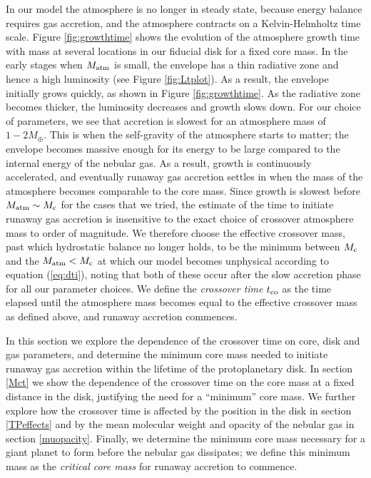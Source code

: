 \documentclass[apj]{emulateapj}
\begin{document}
In our model the atmosphere is no longer in steady state, because energy balance requires gas accretion, and the atmosphere contracts on a Kelvin-Helmholtz time scale. Figure \ref{fig:growthtime} shows the evolution of the atmosphere growth time with mass at several locations in our fiducial disk for a fixed core mass. In the early stages when $M_{\rm{atm}}$ is small, the envelope has a thin radiative zone and hence a high luminosity (see Figure \ref{fig:Ltplot}). As a result, the envelope initially grows quickly, as shown in Figure \ref{fig:growthtime}. As the radiative zone becomes thicker, the luminosity decreases and growth slows down. For our choice of parameters, we see that accretion is slowest for an atmosphere mass of $1-2 M_{\oplus}$. This is when the self-gravity of the atmosphere starts to matter; the envelope becomes massive enough for its energy to be large compared to the internal energy of the nebular gas. As a result, growth is continuously accelerated, and eventually runaway gas accretion settles in when the mass of the atmosphere becomes comparable to the core mass. Since growth is slowest before $M_{\rm{atm}} \sim M_{\rm c}$ for the cases that we tried, the estimate of the time to initiate runaway gas accretion is insensitive to the exact choice of crossover atmosphere mass to order of magnitude. We therefore choose the effective crossover mass, past which hydrostatic balance no longer holds, to be the minimum between $M_{\rm{c}}$ and the $M_{\rm{atm}}<M_{\rm c}$ at which our model becomes unphysical according to equation (\ref{eq:dti}), noting that both of these occur after the slow accretion phase for all our parameter choices. We define the \textit{crossover time} $t_{\rm{co}}$ as the time elapsed until the atmosphere mass becomes equal to the effective crossover mass as defined above, and runaway accretion commences.

In this section we explore the dependence of the crossover time on core, disk and gas parameters, and determine the minimum core mass needed to initiate runaway gas accretion within the lifetime of the protoplanetary disk. In section \ref{Mct} we show the dependence of the crossover time on the core mass at a fixed distance in the disk, justifying the need for a ``minimum'' core mass. We further explore how the crossover time is affected by the position in the disk in section \ref{TPeffects} and by the mean molecular weight and opacity of the nebular gas in section \ref{muopacity}. Finally, we determine the minimum core mass necessary for a giant planet to form before the nebular gas dissipates; we define this minimum mass as the \textit{critical core mass} for runaway accretion to commence. 
\end{document}
